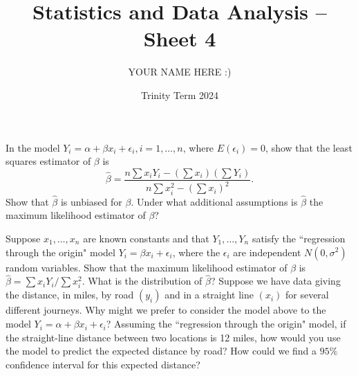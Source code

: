 \documentclass[answers]{exam}
\title{Statistics and Data Analysis -- Sheet 4}
\author{YOUR NAME HERE :)}
\date{Trinity Term 2024}
\begin{document}
\maketitle
\begin{questions}

\question%
In the model $Y_{i}=\alpha+\beta x_{i}+\epsilon_{i}, i=1, \ldots, n$, where $E\left(\epsilon_{i}\right)=0$, show that the least squares estimator of $\beta$ is \[
	\widehat{\beta}=\frac{n \sum x_{i} Y_{i}-\left(\sum x_{i}\right)\left(\sum Y_{i}\right)}{n \sum x_{i}^{2}-\left(\sum x_{i}\right)^{2}} .
\] Show that $\widehat{\beta}$ is unbiased for $\beta$. Under what additional assumptions is $\widehat{\beta}$ the maximum likelihood estimator of $\beta$?



\question%
\begin{subparts}
\subpart Suppose $x_{1}, \ldots, x_{n}$ are known constants and that $Y_{1}, \ldots, Y_{n}$ satisfy the ``regression through the origin" model $Y_{i}=\beta x_{i}+\epsilon_{i}$, where the $\epsilon_{i}$ are independent $N\left(0, \sigma^{2}\right)$ random variables. Show that the maximum likelihood estimator of $\beta$ is $\widehat{\beta}=\sum x_{i} Y_{i} / \sum x_{i}^{2}$. What is the distribution of $\widehat{\beta}$?
\subpart Suppose we have data giving the distance, in miles, by road $\left(y_{i}\right)$ and in a straight line $\left(x_{i}\right)$ for several different journeys. Why might we prefer to consider the model above to the model $Y_{i}=\alpha+\beta x_{i}+\epsilon_{i}$?
\subpart Assuming the ``regression through the origin" model, if the straight-line distance between two locations is 12 miles, how would you use the model to predict the expected distance by road? How could we find a $95 \%$ confidence interval for this expected distance?
\end{subparts}




\end{questions}
\end{document}
